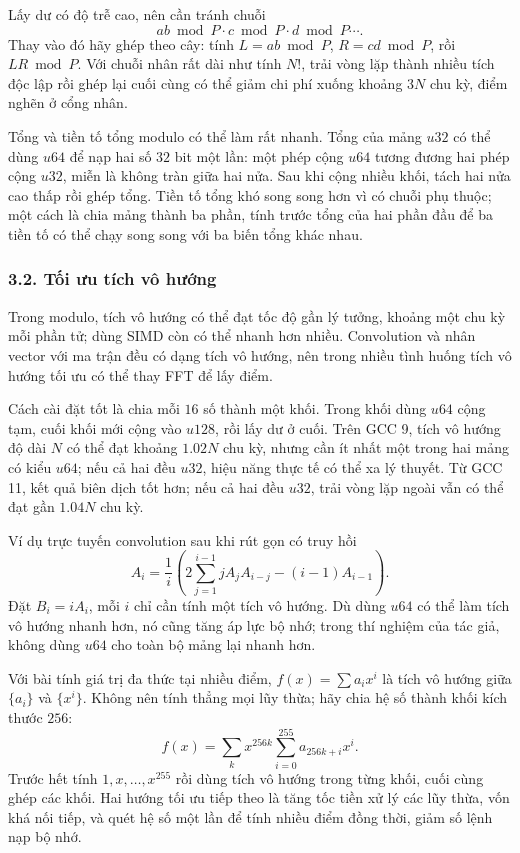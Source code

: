 \documentclass[11pt]{article}
\begin{document}
Lấy dư có độ trễ cao, nên cần tránh chuỗi
\[
  a b\bmod P \cdot c\bmod P \cdot d\bmod P\cdots .
\]
Thay vào đó hãy ghép theo cây: tính \(L=a b\bmod P\), \(R=c d\bmod P\), rồi
\(L R\bmod P\). Với chuỗi nhân rất dài như tính \(N!\), trải vòng lặp thành
nhiều tích độc lập rồi ghép lại cuối cùng có thể giảm chi phí xuống khoảng
\(3N\) chu kỳ, điểm nghẽn ở cổng nhân.

Tổng và tiền tố tổng modulo có thể làm rất nhanh. Tổng của mảng \(u32\) có thể
dùng \(u64\) để nạp hai số \(32\) bit một lần: một phép cộng \(u64\) tương đương
hai phép cộng \(u32\), miễn là không tràn giữa hai nửa. Sau khi cộng nhiều
khối, tách hai nửa cao thấp rồi ghép tổng. Tiền tố tổng khó song song hơn vì có
chuỗi phụ thuộc; một cách là chia mảng thành ba phần, tính trước tổng của hai
phần đầu để ba tiền tố có thể chạy song song với ba biến tổng khác nhau.

\subsubsection*{3.2. Tối ưu tích vô hướng}

Trong modulo, tích vô hướng có thể đạt tốc độ gần lý tưởng, khoảng một chu kỳ
mỗi phần tử; dùng SIMD còn có thể nhanh hơn nhiều. Convolution và nhân vector
với ma trận đều có dạng tích vô hướng, nên trong nhiều tình huống tích vô hướng
tối ưu có thể thay FFT để lấy điểm.

Cách cài đặt tốt là chia mỗi \(16\) số thành một khối. Trong khối dùng \(u64\)
cộng tạm, cuối khối mới cộng vào \(u128\), rồi lấy dư ở cuối. Trên GCC 9, tích
vô hướng độ dài \(N\) có thể đạt khoảng \(1.02N\) chu kỳ, nhưng cần ít nhất một
trong hai mảng có kiểu \(u64\); nếu cả hai đều \(u32\), hiệu năng thực tế có
thể xa lý thuyết. Từ GCC 11, kết quả biên dịch tốt hơn; nếu cả hai đều \(u32\),
trải vòng lặp ngoài vẫn có thể đạt gần \(1.04N\) chu kỳ.

Ví dụ trực tuyến convolution sau khi rút gọn có truy hồi
\[
  A_i=\frac{1}{i}\left(2\sum_{j=1}^{i-1}jA_jA_{i-j}-(i-1)A_{i-1}\right).
\]
Đặt \(B_i=iA_i\), mỗi \(i\) chỉ cần tính một tích vô hướng. Dù dùng \(u64\) có
thể làm tích vô hướng nhanh hơn, nó cũng tăng áp lực bộ nhớ; trong thí nghiệm
của tác giả, không dùng \(u64\) cho toàn bộ mảng lại nhanh hơn.

Với bài tính giá trị đa thức tại nhiều điểm, \(f(x)=\sum a_i x^i\) là tích vô
hướng giữa \(\{a_i\}\) và \(\{x^i\}\). Không nên tính thẳng mọi lũy thừa; hãy
chia hệ số thành khối kích thước \(256\):
\[
  f(x)=\sum_k x^{256k}\sum_{i=0}^{255} a_{256k+i}x^i.
\]
Trước hết tính \(1,x,\ldots,x^{255}\) rồi dùng tích vô hướng trong từng khối,
cuối cùng ghép các khối. Hai hướng tối ưu tiếp theo là tăng tốc tiền xử lý các
lũy thừa, vốn khá nối tiếp, và quét hệ số một lần để tính nhiều điểm đồng thời,
giảm số lệnh nạp bộ nhớ.
\end{document}
